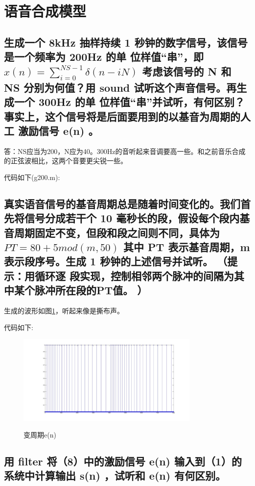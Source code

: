\documentclass{ctexart}
\begin{document}
\section{
语音合成模型
}
\setcounter{subsection}{6} 

\subsection{
生成一个 8kHz 抽样持续 1 秒钟的数字信号，该信号是一个频率为 200Hz 的单
位样值“串”，即
$x(n)=\sum_{i=0}^{NS-1}\delta(n-iN)$
考虑该信号的 N 和 NS 分别为何值？用 sound 试听这个声音信号。再生成一个 300Hz 的单
位样值“串”并试听，有何区别？事实上，这个信号将是后面要用到的以基音为周期的人工
激励信号 e(n) 。
}

答：NS应当为200，N应为40。300Hz的音听起来音调要高一些。和之前音乐合成的正弦波相比，这两个音要更尖锐一些。

代码如下(g200.m):

\subsection{
真实语音信号的基音周期总是随着时间变化的。我们首先将信号分成若干个 10
毫秒长的段，假设每个段内基音周期固定不变，但段和段之间则不同，具体为
$PT = 80 + 5mod(m,50)$
其中 PT 表示基音周期，m 表示段序号。生成 1 秒钟的上述信号并试听。 （提示：用循环逐
段实现，控制相邻两个脉冲的间隔为其中某个脉冲所在段的PT值。 ）
}
生成的波形如图\ref{8wave}，听起来像是撕布声。

代码如下:


\begin{figure}
    \centering
    \includegraphics[width=0.8\textwidth]{8wave.jpg}\\
    \caption{变周期e(n)\label{8wave}}
\end{figure}

\subsection{
用 filter 将（8）中的激励信号 e(n) 输入到（1）的系统中计算输出 s(n) ，试听和
e(n) 有何区别。
}
\end{document}
